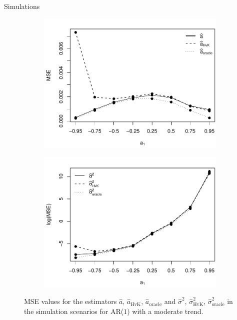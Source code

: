 \documentclass[10pt, handout]{beamer}
\begin{document}
\begin{frame}{Simulations}
\begin{figure}[t!]
\begin{subfigure}[b]{0.475\textwidth}
\includegraphics[width=\textwidth]{MSE_a1_T=500_slope=1_(q,r,M1,M2)=(25,10,20,30).pdf}
\end{subfigure}\hspace{0.25cm}
\begin{subfigure}[b]{0.475\textwidth}
\includegraphics[width=\textwidth]{MSE_lrv_T=500_slope=1_(q,r,M1,M2)=(25,10,20,30).pdf}
\end{subfigure}
\caption{MSE values for the estimators $\widehat{a}$, $\widehat{a}_{\text{HvK}}$, $\widehat{a}_{\text{oracle}}$ and $\widehat{\sigma}^2$, $\widehat{\sigma}^2_{\text{HvK}}$, $\widehat{\sigma}^2_{\text{oracle}}$ in the simulation scenarios for AR($1$) with a moderate trend. %
}\label{fig:MSE_slope1}
\end{figure}
\end{frame}
\end{document}
